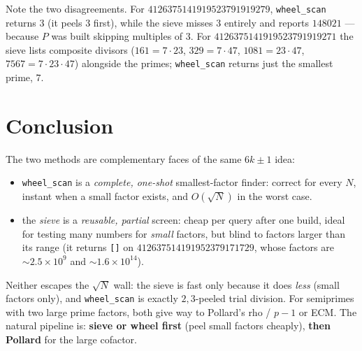 \documentclass[11pt]{article}
\begin{document}
\noindent Note the two disagreements. For $4126375141919523791919279$,
\texttt{wheel\_scan} returns $3$ (it peels $3$ first), while the sieve misses $3$
entirely and reports $148021$ --- because $P$ was built skipping multiples of $3$.
For $4126375141919523791919271$ the sieve lists composite divisors
($161=7\cdot23$, $329=7\cdot47$, $1081=23\cdot47$, $7567=7\cdot23\cdot47$) alongside
the primes; \texttt{wheel\_scan} returns just the smallest prime, $7$.

\section{Conclusion}

The two methods are complementary faces of the same $6k\pm1$ idea:
\begin{itemize}
\item \texttt{wheel\_scan} is a \emph{complete, one-shot} smallest-factor finder:
correct for every $N$, instant when a small factor exists, and $O(\sqrt N)$ in the
worst case.
\item the \emph{sieve} is a \emph{reusable, partial} screen: cheap per query after
one build, ideal for testing many numbers for \emph{small} factors, but blind to
factors larger than its range (it returns \texttt{[]} on
$412637514191952379171729$, whose factors are $\sim\!2.5{\times}10^9$ and
$\sim\!1.6{\times}10^{14}$).
\end{itemize}
Neither escapes the $\sqrt N$ wall: the sieve is fast only because it does
\emph{less} (small factors only), and \texttt{wheel\_scan} is exactly
$2,3$-peeled trial division. For semiprimes with two large prime factors, both give
way to Pollard's rho / $p-1$ or ECM. The natural pipeline is: \textbf{sieve or wheel
first} (peel small factors cheaply), \textbf{then Pollard} for the large cofactor.
\end{document}
